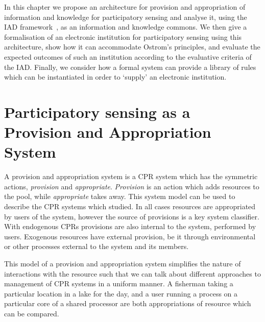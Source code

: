 In this chapter we propose an architecture for provision and appropriation of information and knowledge for participatory sensing and analyse it, using the \ac{IAD} framework~\citep{Ostrom2005}, as an information and knowledge commons.
We then give a formalisation of an electronic institution for participatory sensing using this architecture, show how it can accommodate Ostrom's principles,
and evaluate the expected outcomes of such an institution according to the evaluative criteria of the \ac{IAD}.
Finally, we consider how a formal system can provide a library of rules which can be instantiated in order to `supply' an electronic institution. 


\section{Participatory sensing as a Provision and Appropriation System}

A provision and appropriation system is a \ac{CPR} system which has the
symmetric actions, \emph{provision} and \emph{appropriate}. \emph{Provision}
is an action which adds resources to the pool, while \emph{appropriate} takes
away. This system model can be used to describe the \ac{CPR} systems which
\citet{Ostrom1990} studied. In all cases resources are appropriated by users
of the system, however the source of provisions is a key system classifier.
With endogenous \acp{CPR} provisions are also internal to the system,
performed by users. Exogenous resources have external provision, be it through
environmental or other processes external to the system and its members.

This model of a provision and appropriation system simplifies the nature of
interactions with the resource such that we can talk about different
approaches to management of \ac{CPR} systems in a uniform manner. A fisherman
taking a particular location in a lake for the day, and a user running a
process on a particular core of a shared processor are both appropriations of
resource which can be compared.

